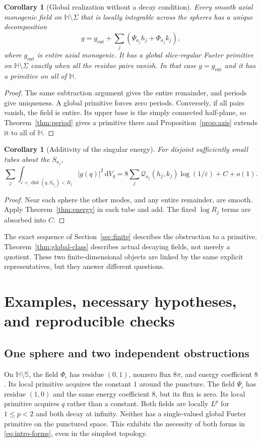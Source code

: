 \documentclass[11pt,a4paper]{article}
\numberwithin{equation}{section}
\newtheorem{corollary}[theorem]{Corollary}
\theoremstyle{definition}
\theoremstyle{remark}
\newcommand{\HH}{\mathbb H}
\newcommand{\SSS}{\mathbb S}
\newcommand{\dd}{\,\mathrm d}
\newcommand{\dist}{\operatorname{dist}}
\begin{document}
\begin{corollary}[Global realization without a decay condition]
\label{cor:entire-remainder}
Every smooth axial monogenic field on $\HH\setminus\Sigma$ that is
locally integrable across the spheres has a unique decomposition
\[
 g=g_{\mathrm{ent}}+\sum_j(\Psi_{a_j}h_j+\Phi_{a_j}k_j),
\]
where $g_{\mathrm{ent}}$ is entire axial monogenic. It has a global
slice-regular Fueter primitive on $\HH\setminus\Sigma$ exactly when
all the residue pairs vanish. In that case $g=g_{\mathrm{ent}}$ and
it has a primitive on all of $\HH$.
\end{corollary}
\begin{proof}
The same subtraction argument gives the entire remainder, and periods
give uniqueness. A global primitive forces zero periods. Conversely,
if all pairs vanish, the field is entire. Its upper base is the simply
connected half-plane, so Theorem~\ref{thm:period} gives a primitive
there and Proposition~\ref{prop:axis} extends it to all of $\HH$.
\end{proof}

\begin{corollary}[Additivity of the singular energy]
For disjoint sufficiently small tubes about the $S_{a_j}$,
\[
 \sum_j\int_{\varepsilon<\dist(q,S_{a_j})<R_j}|g(q)|^2\dd V_q
 =8\sum_j\mathcal Q_{a_j}(h_j,k_j)\log(1/\varepsilon)+C+o(1).
\]
\end{corollary}
\begin{proof}
Near each sphere the other modes, and any entire remainder, are smooth.
Apply Theorem~\ref{thm:energy} in each tube and add. The fixed
$\log R_j$ terms are absorbed into $C$.
\end{proof}

The exact sequence of Section~\ref{sec:finite} describes the obstruction
to a primitive. Theorem~\ref{thm:global-class} describes actual decaying
fields, not merely a quotient. These two finite-dimensional objects are
linked by the same explicit representatives, but they answer different
questions.

\section{Examples, necessary hypotheses, and reproducible checks}
\label{sec:examples}

\subsection{One sphere and two independent obstructions}
On $\HH\setminus\SSS$, the field $\Phi_{\iota}$ has residue $(0,1)$,
nonzero flux $8\pi$, and energy coefficient $8$. Its local primitive
acquires the constant $1$ around the puncture. The field $\Psi_{\iota}$
has residue $(1,0)$ and the same energy coefficient $8$, but its flux
is zero. Its local primitive acquires $q$ rather than a constant.
Both fields are locally $L^p$ for $1\le p<2$ and both decay at infinity.
Neither has a single-valued global Fueter primitive on the punctured
space. This exhibits the necessity of both forms in
\eqref{eq:intro-forms}, even in the simplest topology.
\end{document}
